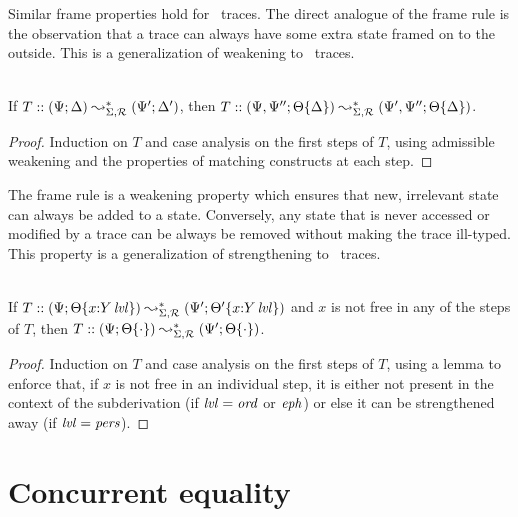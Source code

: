 Similar frame properties hold for \sls~traces. The direct analogue of
the frame rule is the observation that a trace can always have some
extra state framed on to the outside. This is a generalization of
weakening to \sls~traces.

\bigskip
\begin{theorem}\label{thm:frameweak}~\\
If $T :: (\Psi; \Delta) \leadsto^*_{\Sigma, \mathcal R} (\Psi'; \Delta')$, then
$T :: (\Psi, \Psi''; {\Theta}\{{\Delta}\})
       \leadsto^*_{\Sigma, \mathcal R} (\Psi', \Psi''; {\Theta}\{{\Delta}\})$.
\end{theorem}
\begin{proof}
Induction on $T$ and case analysis on the first steps of $T$, using admissible
weakening and the properties of matching constructs at each step.
\end{proof}

The frame rule is a weakening property which ensures that new,
irrelevant state can always be added to a state. Conversely, any
state that is never accessed or modified by a trace can be always be 
removed without making the trace ill-typed. This property
is a generalization of strengthening to \sls~traces.

\bigskip
\begin{theorem}\label{thm:framestrong}~\\
  If $T :: (\Psi; {\Theta}\{{x{:}{Y}\,{{\it lvl}}}\}) \leadsto^*_{\Sigma,
    \mathcal R} (\Psi'; {\Theta'}\{{x{:}{Y}\,{{\it lvl}}}\})$ and $x$ is not
  free in any of the steps of $T$, then $T :: (\Psi;
  {\Theta}\{{\cdot}\}) \leadsto^*_{\Sigma, \mathcal R} (\Psi';
  {\Theta}\{{\cdot}\})$.
\end{theorem}
\begin{proof}
  Induction on $T$ and case analysis on the first steps of $T$, using
  a lemma to enforce that, if $x$ is not free in an individual step,
  it is either not present in the context of the subderivation 
  (if ${\it lvl} = {\it ord}$ or ${\it eph}$) or else
  it can be strengthened away (if ${\it lvl} = {\it pers}$).
\end{proof}

\section{Concurrent equality}
\label{sec:linconcurrenteq}
\label{sec:framework-concurrenteq}

